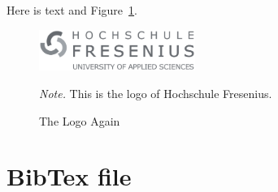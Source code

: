 \documentclass[
  stu,
  floatsintext,
  longtable,
  a4paper,
  nolmodern,
  notxfonts,
  notimes,
  colorlinks=true,linkcolor=black,citecolor=black,urlcolor=black]{apa7}
\begin{document}
Here is text and Figure~\ref{fig-logo5}.

\begin{figure}[h]

{\caption{{The Logo Again}{\label{fig-logo5}}}}

\includegraphics[width=2in,height=\textheight,keepaspectratio]{logo.png}

\noindent \emph{Note.} This is the logo of Hochschule Fresenius.

\end{figure}

\newpage

\section{BibTex file}\label{sec-bibtexfile}
\end{document}
